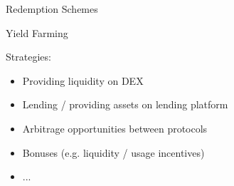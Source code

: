 \documentclass[handout]{beamer}
\begin{document}
\begin{frame}{Redemption Schemes}

	
\end{frame}


\begin{frame}{Yield Farming}

Strategies: \\ \vspace{1em}

	\begin{itemize}
	

		\item<1-> Providing liquidity on DEX
		\item<2-> Lending / providing assets on lending platform
		\item<3-> Arbitrage opportunities between protocols
		\item<4-> Bonuses (e.g. liquidity / usage incentives)
		\item<4->...
	\end{itemize}


	
\end{frame}
\end{document}
